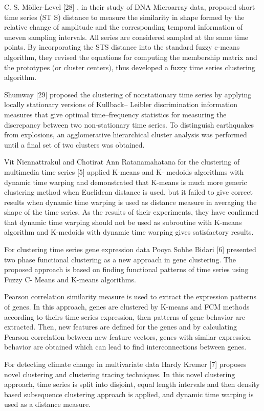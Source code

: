 C. S. Möller-Level  [28] , in their study of DNA Microarray data, proposed short time series (ST S) distance to measure the similarity in shape formed by the relative change of amplitude and the corresponding temporal information of uneven sampling intervals. All series are considered sampled at the same time points. By incorporating the STS distance into the standard fuzzy c-means algorithm, they revised the equations for computing the membership matrix and the prototypes (or cluster centers), thus developed a fuzzy time series clustering algorithm.

Shumway [29] proposed the clustering of nonstationary time series by applying locally stationary versions of Kullback– Leibler discrimination information measures that give optimal time–frequency statistics for measuring the discrepancy between two non-stationary time series. To distinguish earthquakes from explosions, an  agglomerative hierarchical cluster analysis was performed until a final set of two clusters was obtained.

Vit Niennattrakul and Chotirat Ann Ratanamahatana for the clustering of multimedia time series [5] applied K-means and K- medoids algorithms with dynamic time warping and demonstrated that K-means is much more generic clustering method when Euclidean distance is used, but it failed to give correct results when dynamic time warping is used as distance measure in averaging the shape of the time series. As the results   of   their   experiments,   they   have   confirmed   that dynamic time warping should not be used as subroutine with K-means   algorithm   and   K-medoids   with   dynamic   time warping gives satisfactory results.

For clustering time series gene expression data Pooya Sobhe Bidari [6] presented two phase functional clustering as a new approach in gene clustering. The proposed approach is based on finding functional patterns of time series using Fuzzy C- Means and K-means algorithms.
 
Pearson correlation similarity measure is used to extract the expression patterns of genes. In this approach, genes are clustered by K-means and FCM methods according to theirs time series expression, then patterns of gene behavior are extracted. Then, new features are defined for the genes and by calculating Pearson correlation between new feature vectors, genes with similar expression behavior are obtained which can lead to find interconnections between genes.

For detecting climate change in multivariate data Hardy Kremer [7] proposes novel clustering and clustering tracing techniques. In this novel clustering approach, time series is split  into  disjoint,  equal  length  intervals  and  then  density based   subsequence   clustering   approach   is   applied,   and dynamic time warping is used as a distance measure.

